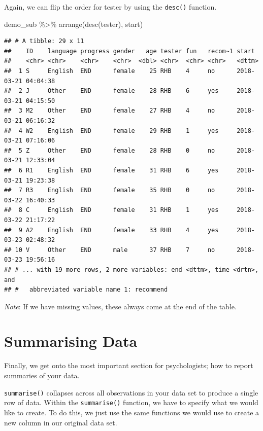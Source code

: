 \documentclass[
]{book}
\newenvironment{Shaded}{\begin{snugshade}}{\end{snugshade}}
\newcommand{\FunctionTok}[1]{\textcolor[rgb]{0.00,0.00,0.00}{#1}}
\newcommand{\NormalTok}[1]{#1}
\newcommand{\SpecialCharTok}[1]{\textcolor[rgb]{0.00,0.00,0.00}{#1}}
\begin{document}
Again, we can flip the order for tester by using the \texttt{desc()} function.

\begin{Shaded}
\begin{Highlighting}[]
\NormalTok{demo\_sub }\SpecialCharTok{\%\textgreater{}\%} \FunctionTok{arrange}\NormalTok{(}\FunctionTok{desc}\NormalTok{(tester), start)}
\end{Highlighting}
\end{Shaded}

\begin{verbatim}
## # A tibble: 29 x 11
##    ID    language progress gender   age tester fun   recom~1 start              
##    <chr> <chr>    <chr>    <chr>  <dbl> <chr>  <chr> <chr>   <dttm>             
##  1 S     English  END      female    25 RHB    4     no      2018-03-21 04:04:38
##  2 J     Other    END      female    28 RHB    6     yes     2018-03-21 04:15:50
##  3 M2    Other    END      female    27 RHB    4     no      2018-03-21 06:16:32
##  4 W2    English  END      female    29 RHB    1     yes     2018-03-21 07:16:06
##  5 Z     Other    END      female    28 RHB    0     no      2018-03-21 12:33:04
##  6 R1    English  END      female    31 RHB    6     yes     2018-03-21 19:23:38
##  7 R3    English  END      female    35 RHB    0     no      2018-03-22 16:40:33
##  8 C     English  END      female    31 RHB    1     yes     2018-03-22 21:17:22
##  9 A2    English  END      female    33 RHB    4     yes     2018-03-23 02:48:32
## 10 V     Other    END      male      37 RHB    7     no      2018-03-23 19:56:16
## # ... with 19 more rows, 2 more variables: end <dttm>, time <drtn>, and
## #   abbreviated variable name 1: recommend
\end{verbatim}

\emph{Note}: If we have missing values, these always come at the end of the table.

\hypertarget{summarising-data}{%
\section{Summarising Data}\label{summarising-data}}

Finally, we get onto the most important section for psychologists; how to report summaries of your data.

\texttt{summarise()} collapses across all observations in your data set to produce a single row of data. Within the \texttt{summarise()} function, we have to specify what we would like to create. To do this, we just use the same functions we would use to create a new column in our original data set.
\end{document}

